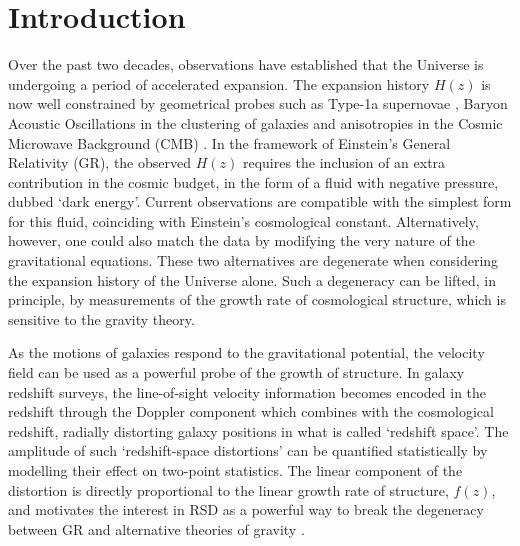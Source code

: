 \documentclass[longauth]{aa}
\begin{document}
\section{Introduction}		 									  %

Over the past two decades, observations have established that the Universe is undergoing a period of accelerated expansion. The expansion history $H(z)$ is now well constrained by geometrical probes such as Type-1a supernovae \citep{riess98,perlmutter99}, Baryon Acoustic Oscillations \citep[BAO; e.g.][]{anderson14} in the clustering of galaxies and anisotropies in the Cosmic Microwave Background (CMB) \citep[e.g.][]{planck15}. In the framework of Einstein's General Relativity (GR), the observed $H(z)$ requires the inclusion of an extra contribution in the cosmic budget, in the form of a fluid with negative pressure, dubbed `dark energy'.  Current observations are compatible with the simplest form for this fluid, coinciding with Einstein's cosmological constant. Alternatively, however, one could also match the data by modifying the very nature of the gravitational equations. These two alternatives are degenerate when considering the expansion history of the Universe alone. Such a degeneracy can be lifted, in principle, by measurements of the growth rate of cosmological structure, which is sensitive to the gravity theory.

As the motions of galaxies respond to the gravitational potential, the velocity field can be used as a powerful probe of the growth of structure.  In galaxy redshift surveys, the line-of-sight velocity information becomes encoded in the redshift through the Doppler component which combines with the cosmological redshift, radially distorting galaxy positions in what is called `redshift space'. The amplitude of such `redshift-space distortions' \citep[RSD;][]{kaiser87}  can be quantified statistically by modelling their effect on two-point statistics. The linear component of the distortion is directly proportional to the linear growth rate of structure, $f(z)$, and motivates the interest in RSD as a powerful way to break the degeneracy between GR and alternative theories of gravity \citep[][]{guzzo08}.   
\end{document}

